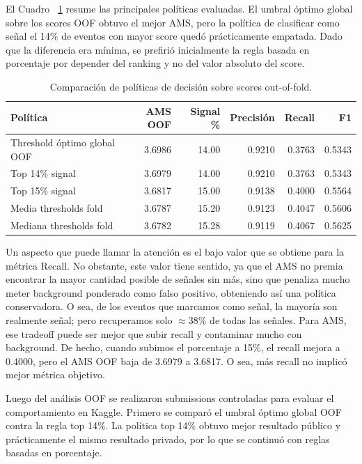 \documentclass{article}
\begin{document}
El Cuadro ~\ref{tab:politicas-oof} resume las principales políticas evaluadas. El umbral óptimo global sobre los scores OOF obtuvo el mejor AMS, pero la política de clasificar como señal el 14\% de eventos con mayor score quedó prácticamente empatada. Dado que la diferencia era mínima, se prefirió inicialmente la regla basada en porcentaje por depender del ranking y no del valor absoluto del score.

\begin{table}[H]
    \centering
    \small
    \begin{tabular}{@{}p{} r r r r r@{}}
        \toprule
        Política & AMS OOF & Signal \% & Precisión & Recall & F1 \\
        \midrule
        Threshold óptimo global OOF & 3.6986 & 14.00 & 0.9210 & 0.3763 & 0.5343 \\
        Top 14\% signal & 3.6979 & 14.00 & 0.9210 & 0.3763 & 0.5343 \\
        Top 15\% signal & 3.6817 & 15.00 & 0.9138 & 0.4000 & 0.5564 \\
        Media thresholds fold & 3.6787 & 15.20 & 0.9123 & 0.4047 & 0.5606 \\
        Mediana thresholds fold & 3.6782 & 15.28 & 0.9119 & 0.4067 & 0.5625 \\
        \bottomrule
    \end{tabular}
    \caption{Comparación de políticas de decisión sobre scores out-of-fold.}
    \label{tab:politicas-oof}
\end{table}

Un aspecto que puede llamar la atención es el bajo valor que se obtiene para la métrica Recall. No obstante, este valor tiene sentido, ya que el AMS no premia encontrar la mayor cantidad posible de señales sin más, sino que penaliza mucho meter background ponderado como falso positivo, obteniendo así una política conservadora. O sea, de los eventos que marcamos como señal, la mayoría son realmente señal; pero recuperamos solo $\approx 38\%$ de todas las señales. Para AMS, ese tradeoff puede ser mejor que subir recall y contaminar mucho con background. De hecho, cuando subimos el porcentaje a 15\%, el recall mejora a 0.4000, pero el AMS OOF baja de 3.6979 a 3.6817. O sea, más recall no implicó mejor métrica objetivo.

Luego del análisis OOF se realizaron submissions controladas para evaluar el comportamiento en Kaggle. Primero se comparó el umbral óptimo global OOF contra la regla top 14\%. La política top 14\% obtuvo mejor resultado público y prácticamente el mismo resultado privado, por lo que se continuó con reglas basadas en porcentaje.
\end{document}
